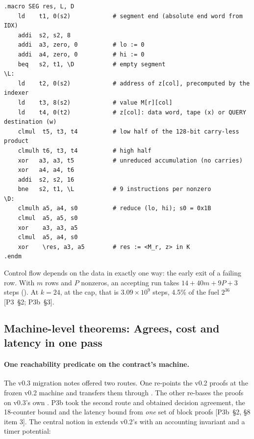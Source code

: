 \begin{Verbatim}[fontsize=\small,frame=single,framerule=0.3pt,rulecolor=\color{black!30},
  framesep=4pt,label={\footnotesize asm/baseline.S: the segment macro (comments annotated)}]
.macro SEG res, L, D
    ld    t1, 0(s2)            # segment end (absolute end word from IDX)
    addi  s2, s2, 8
    addi  a3, zero, 0          # lo := 0
    addi  a4, zero, 0          # hi := 0
    beq   s2, t1, \D           # empty segment
\L:
    ld    t2, 0(s2)            # address of z[col], precomputed by the indexer
    ld    t3, 8(s2)            # value M[r][col]
    ld    t4, 0(t2)            # z[col]: data word, tape (x) or QUERY destination (w)
    clmul  t5, t3, t4          # low half of the 128-bit carry-less product
    clmulh t6, t3, t4          # high half
    xor   a3, a3, t5           # unreduced accumulation (no carries)
    xor   a4, a4, t6
    addi  s2, s2, 16
    bne   s2, t1, \L           # 9 instructions per nonzero
\D:
    clmulh a5, a4, s0          # reduce (lo, hi); s0 = 0x1B
    clmul  a5, a5, s0
    xor    a3, a3, a5
    clmul  a5, a4, s0
    xor    \res, a3, a5        # res := <M_r, z> in K
.endm
\end{Verbatim}

Control flow depends on the data in exactly one way: the early exit of a failing row. With $m$ rows
and $P$ nonzeros, an accepting run takes $14+40m+9P+3$ steps (). At $k=24$, at the
cap, that is $3.09\times10^9$ steps, 4.5\% of the fuel $2^{36}$ [P3~§2; P3b~§3].

\subsection{Machine-level theorems: Agrees, cost and latency in one pass}\label{subsec:base-machine}

\paragraph{One reachability predicate on the contract's machine.} The v0.3 migration notes offered
two routes. One re-points the v0.2 proofs at the frozen v0.2 machine  and transfers
them through . The other re-bases the proofs on v0.3's own . P3b
took the second route and obtained decision agreement, the 18-counter bound and the latency bound
from \emph{one} set of block proofs [P3b~§2, §8 item 3]. The central notion in 
extends v0.2's  with an accounting invariant and a timer potential:

